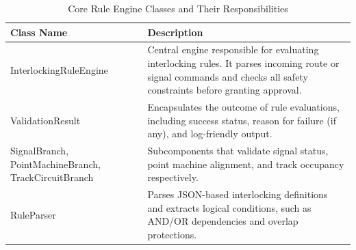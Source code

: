 \begin{table}[H]
    \centering
    \renewcommand{\arraystretch}{1.3}
    \caption{Core Rule Engine Classes and Their Responsibilities}
    \begin{tabular}{|p{5cm}|p{9.5cm}|}
        \hline
        \textbf{Class Name} & \textbf{Description} \\\hline
        InterlockingRuleEngine & Central engine responsible for evaluating interlocking rules. It parses incoming route or signal commands and checks all safety constraints before granting approval. \\\hline
        ValidationResult & Encapsulates the outcome of rule evaluations, including success status, reason for failure (if any), and log-friendly output. \\\hline
        SignalBranch, PointMachineBranch, TrackCircuitBranch & Subcomponents that validate signal status, point machine alignment, and track occupancy respectively. \\\hline
        RuleParser & Parses JSON-based interlocking definitions and extracts logical conditions, such as AND/OR dependencies and overlap protections. \\\hline
    \end{tabular}
    \label{tab:rule-engine-classes}
\end{table}